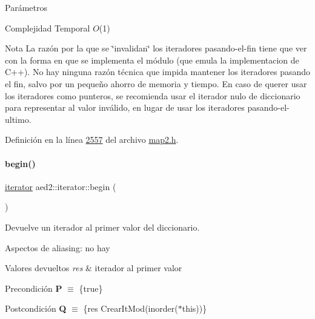\begin{DoxyParams}{\-Parámetros}
\begin{DoxyCompactItemize}
\begin{DoxyDescription}
\item[Complejidad Temporal]$O$(1)
\end{DoxyDescription}

\begin{DoxyNote}{Nota}
La razón por la que se \char`\"{}invalidan\char`\"{} los iteradores pasando-\/el-\/fin tiene que ver con la forma en que se implementa el módulo (que emula la implementacion de C++). No hay ninguna razón técnica que impida mantener los iteradores pasando el fin, salvo por un pequeño ahorro de memoria y tiempo. En caso de querer usar los iteradores como punteros, se recomienda usar el iterador nulo de diccionario para representar al valor inválido, en lugar de usar los iteradores pasando-\/el-\/ultimo. 
\end{DoxyNote}


Definición en la línea \hyperlink{map2_8h_source_l02557}{2557} del archivo \hyperlink{map2_8h_source}{map2.\+h}.

\mbox{\label{classaed2_1_1iterator_af8901de173468531c58458b581d345a6_af8901de173468531c58458b581d345a6}} 
\paragraph{\texorpdfstring{begin()}{begin()}\hspace{0.1cm}{\footnotesize\ttfamily [1/2]}}
{\footnotesize\ttfamily \hyperlink{classaed2_1_1iterator_1_1iterator}{iterator} aed2\+::iterator\+::begin (\begin{DoxyParamCaption}{ }\end{DoxyParamCaption})\hspace{0.3cm}{\ttfamily [inline]}}



Devuelve un iterador al primer valor del diccionario. 

\begin{DoxyParagraph}{Aspectos de aliasing\+:}
no hay
\end{DoxyParagraph}

\begin{DoxyRetVals}{Valores devueltos}
{\em res} & iterador al primer valor\\
\hline
\end{DoxyRetVals}
\begin{DoxyPrecond}{Precondición}
{\bfseries P} $\equiv$ \{true\} 
\end{DoxyPrecond}
\begin{DoxyPostcond}{Postcondición}
{\bfseries Q} $\equiv$ \{res  Crear\+It\+Mod(inorder($\ast$this))\}
\end{DoxyPostcond}


\end{DoxyCompactItemize}
\end{DoxyParams}
